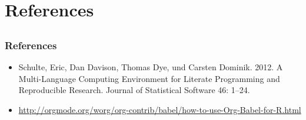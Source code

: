 \documentclass[bigger]{beamer}
\begin{document}
\section{References}
\label{sec-5}
\subsection{}
\begin{frame}
\frametitle{References}
\label{sec-5-1-1}


\begin{itemize}
\item Schulte, Eric, Dan Davison, Thomas Dye, und Carsten Dominik. 2012. A
  Multi-Language Computing Environment for Literate Programming and Reproducible
  Research. Journal of Statistical Software 46: 1–24.
\item \href{http://orgmode.org/worg/org-contrib/babel/how-to-use-Org-Babel-for-R.html}{http://orgmode.org/worg/org-contrib/babel/how-to-use-Org-Babel-for-R.html}
\end{itemize}
\end{frame}
\end{document}
